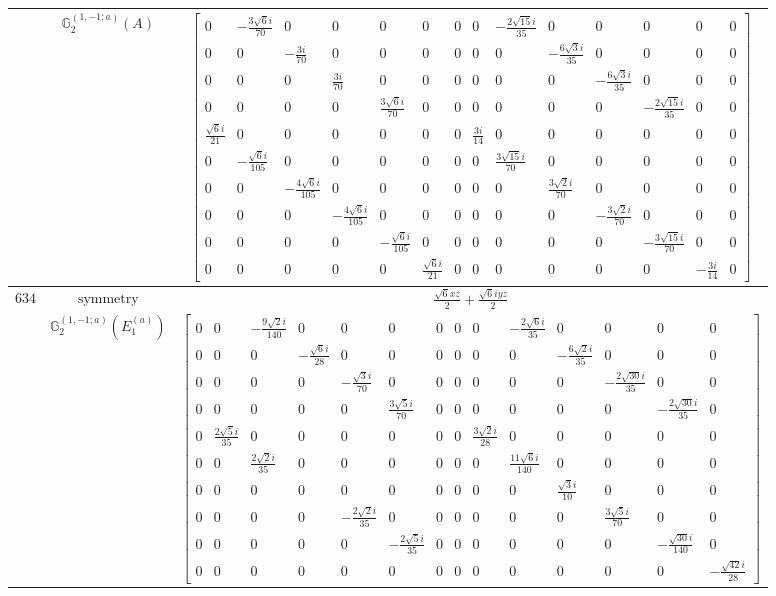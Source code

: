 \documentclass[fleqn,8pt,landscape]{jsarticle}
\begin{document}
\begin{longtable}{ccc}
$  $ & $ \mathbb{G}_{2}^{(1,-1;a)}(A) $ & $ \begin{bmatrix} 0 & - \frac{3 \sqrt{6} i}{70} & 0 & 0 & 0 & 0 & 0 & 0 & - \frac{2 \sqrt{15} i}{35} & 0 & 0 & 0 & 0 & 0 \\ 0 & 0 & - \frac{3 i}{70} & 0 & 0 & 0 & 0 & 0 & 0 & - \frac{6 \sqrt{3} i}{35} & 0 & 0 & 0 & 0 \\ 0 & 0 & 0 & \frac{3 i}{70} & 0 & 0 & 0 & 0 & 0 & 0 & - \frac{6 \sqrt{3} i}{35} & 0 & 0 & 0 \\ 0 & 0 & 0 & 0 & \frac{3 \sqrt{6} i}{70} & 0 & 0 & 0 & 0 & 0 & 0 & - \frac{2 \sqrt{15} i}{35} & 0 & 0 \\ \frac{\sqrt{6} i}{21} & 0 & 0 & 0 & 0 & 0 & 0 & \frac{3 i}{14} & 0 & 0 & 0 & 0 & 0 & 0 \\ 0 & - \frac{\sqrt{6} i}{105} & 0 & 0 & 0 & 0 & 0 & 0 & \frac{3 \sqrt{15} i}{70} & 0 & 0 & 0 & 0 & 0 \\ 0 & 0 & - \frac{4 \sqrt{6} i}{105} & 0 & 0 & 0 & 0 & 0 & 0 & \frac{3 \sqrt{2} i}{70} & 0 & 0 & 0 & 0 \\ 0 & 0 & 0 & - \frac{4 \sqrt{6} i}{105} & 0 & 0 & 0 & 0 & 0 & 0 & - \frac{3 \sqrt{2} i}{70} & 0 & 0 & 0 \\ 0 & 0 & 0 & 0 & - \frac{\sqrt{6} i}{105} & 0 & 0 & 0 & 0 & 0 & 0 & - \frac{3 \sqrt{15} i}{70} & 0 & 0 \\ 0 & 0 & 0 & 0 & 0 & \frac{\sqrt{6} i}{21} & 0 & 0 & 0 & 0 & 0 & 0 & - \frac{3 i}{14} & 0 \end{bmatrix} $ \\ \hline
$ 634 $ & $ \text{symmetry} $ & $ \frac{\sqrt{6} x z}{2} + \frac{\sqrt{6} i y z}{2} $ \\
$  $ & $ \mathbb{G}_{2}^{(1,-1;a)}(E_{1}^{(a)}) $ & $ \begin{bmatrix} 0 & 0 & - \frac{9 \sqrt{2} i}{140} & 0 & 0 & 0 & 0 & 0 & 0 & - \frac{2 \sqrt{6} i}{35} & 0 & 0 & 0 & 0 \\ 0 & 0 & 0 & - \frac{\sqrt{6} i}{28} & 0 & 0 & 0 & 0 & 0 & 0 & - \frac{6 \sqrt{2} i}{35} & 0 & 0 & 0 \\ 0 & 0 & 0 & 0 & - \frac{\sqrt{3} i}{70} & 0 & 0 & 0 & 0 & 0 & 0 & - \frac{2 \sqrt{30} i}{35} & 0 & 0 \\ 0 & 0 & 0 & 0 & 0 & \frac{3 \sqrt{5} i}{70} & 0 & 0 & 0 & 0 & 0 & 0 & - \frac{2 \sqrt{30} i}{35} & 0 \\ 0 & \frac{2 \sqrt{5} i}{35} & 0 & 0 & 0 & 0 & 0 & 0 & \frac{3 \sqrt{2} i}{28} & 0 & 0 & 0 & 0 & 0 \\ 0 & 0 & \frac{2 \sqrt{2} i}{35} & 0 & 0 & 0 & 0 & 0 & 0 & \frac{11 \sqrt{6} i}{140} & 0 & 0 & 0 & 0 \\ 0 & 0 & 0 & 0 & 0 & 0 & 0 & 0 & 0 & 0 & \frac{\sqrt{3} i}{10} & 0 & 0 & 0 \\ 0 & 0 & 0 & 0 & - \frac{2 \sqrt{2} i}{35} & 0 & 0 & 0 & 0 & 0 & 0 & \frac{3 \sqrt{5} i}{70} & 0 & 0 \\ 0 & 0 & 0 & 0 & 0 & - \frac{2 \sqrt{5} i}{35} & 0 & 0 & 0 & 0 & 0 & 0 & - \frac{\sqrt{30} i}{140} & 0 \\ 0 & 0 & 0 & 0 & 0 & 0 & 0 & 0 & 0 & 0 & 0 & 0 & 0 & - \frac{\sqrt{42} i}{28} \end{bmatrix} $ \\ \hline

\end{longtable}
\end{document}

